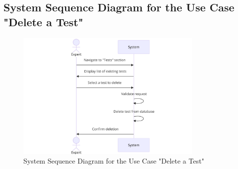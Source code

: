     \subsection{System Sequence Diagram for the Use Case "Delete a Test"}
    \begin{figure}[h!]
        \centering*
        \includegraphics[width=0.8\textwidth]{images/diagram sq .png}
        \caption{System Sequence Diagram for the Use Case "Delete a Test"}
        \label{fig:System Sequence Diagram for the Use Case "Delete a Test"}
    \end{figure}